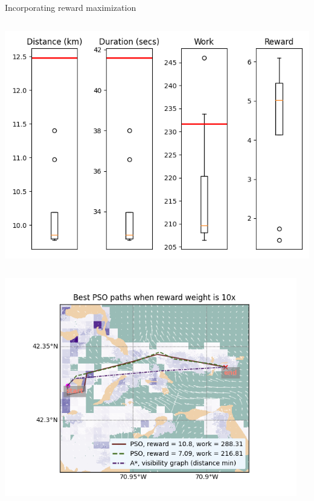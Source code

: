 \documentclass[9pt,xcolor=table]{beamer}
\begin{document}
\begin{frame}{Incorporating reward maximization}
\begin{columns}
\begin{column}{0.37\textwidth}
            \includegraphics[width=\textwidth,trim={0cm 0cm 0cm 0cm},clip]{img/FP1_RW0.1__box.png}
        \end{column}
    \end{columns}
    \begin{columns}
        \begin{column}{0.33\textwidth}
            \includegraphics[width=1.2\textwidth,trim={3cm 0cm 0cm 0cm},clip]{img/paths_FP1_RW10.png}
        \end{column}
        \begin{column}{0.31\textwidth}

\end{column}
\end{columns}
\end{frame}
\end{document}
